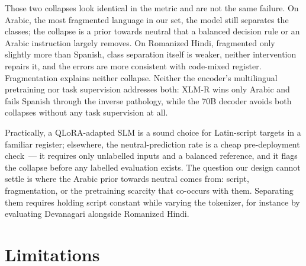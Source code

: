\documentclass[11pt]{article}
\begin{document}
Those two collapses look identical in the metric and are not the same failure.
On Arabic, the most fragmented language in our set, the model still separates the
classes; the collapse is a prior towards neutral that a balanced decision rule or
an Arabic instruction largely removes. On Romanized Hindi, fragmented only slightly
more than Spanish, class separation itself is weaker, neither intervention repairs
it, and the errors are more consistent with code-mixed register. Fragmentation
explains neither collapse. Neither
the encoder's multilingual pretraining nor task supervision addresses both: \mbox{XLM-R}
wins only Arabic and fails Spanish through the inverse pathology, while the 70B
decoder avoids both collapses without any task supervision at all.

Practically, a QLoRA-adapted SLM is a sound choice for Latin-script targets in a
familiar register; elsewhere, the neutral-prediction rate is a
cheap pre-deployment check~--- it requires only unlabelled inputs and a balanced
reference, and it flags the collapse before any labelled evaluation exists. The
question our design cannot settle is where the Arabic prior towards neutral comes
from: script, fragmentation, or the pretraining scarcity that co-occurs with them.
Separating them requires holding script constant while varying the tokenizer, for
instance by evaluating Devanagari alongside Romanized Hindi.

\section*{Limitations}
\end{document}
